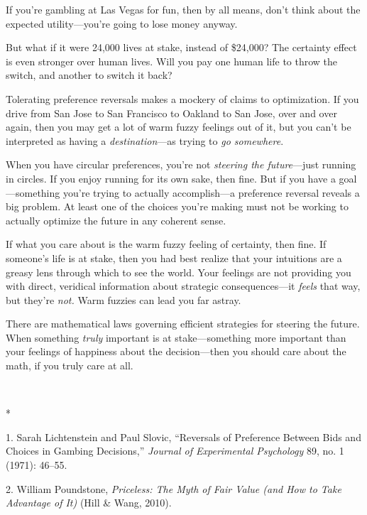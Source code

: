 {
 If you're gambling at Las Vegas for fun, then by
all means, don't think about the expected
utility---you're going to lose money anyway.}

{
 But what if it were 24,000 lives at stake, instead of \$24,000?
The certainty effect is even stronger over human lives. Will you pay
one human life to throw the switch, and another to switch it back?}

{
 Tolerating preference reversals makes a mockery of claims to
optimization. If you drive from San Jose to San Francisco to Oakland to
San Jose, over and over again, then you may get a lot of warm fuzzy
feelings out of it, but you can't be interpreted as
having a \textit{destination}{}---as trying to \textit{go somewhere}.}

{
 When you have circular preferences, you're not
\textit{steering the future}{}---just running in circles. If you enjoy
running for its own sake, then fine. But if you have a goal---something
you're trying to actually accomplish---a preference
reversal reveals a big problem. At least one of the choices
you're making must not be working to actually optimize
the future in any coherent sense.}

{
 If what you care about is the warm fuzzy feeling of certainty,
then fine. If someone's life is at stake, then you had
best realize that your intuitions are a greasy lens through which to
see the world. Your feelings are not providing you with direct,
veridical information about strategic consequences---it \textit{feels}
that way, but they're \textit{not.} Warm fuzzies can
lead you far astray.}

{
 There are mathematical laws governing efficient strategies for
steering the future. When something \textit{truly} important is at
stake---something more important than your feelings of happiness about
the decision---then you should care about the math, if you truly care
at all.}

{\centering
 \ ~
\par}

{\centering
 *
\par}


\bigskip

{
 1. Sarah Lichtenstein and Paul Slovic,
``Reversals of Preference Between Bids and Choices in
Gambing Decisions,'' \textit{Journal of Experimental
Psychology} 89, no. 1 (1971): 46--55.}

{
 2. William Poundstone, \textit{Priceless: The Myth of Fair Value
(and How to Take Advantage of It)} (Hill \& Wang, 2010).}

